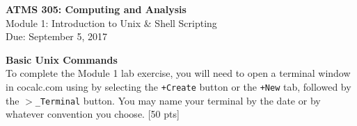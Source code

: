 \documentclass[11 pt,USletter,oneside]{article}
\begin{document}
\begin{center}
\textbf {ATMS 305: Computing and Analysis}\\
Module 1: Introduction to Unix \& Shell Scripting\\
Due: September 5, 2017\\
\end{center}

\noindent
\textbf {Basic Unix Commands}\\
To complete the Module 1 lab exercise, you will need to open a terminal window in cocalc.com using by selecting the 
	\texttt {+Create} button or the 
	\texttt {+New} tab, followed by the 
	\texttt {$>$\_Terminal} button.  You may name your terminal by the date or by whatever convention you choose. [50 pts]\\
 
\end{document}
